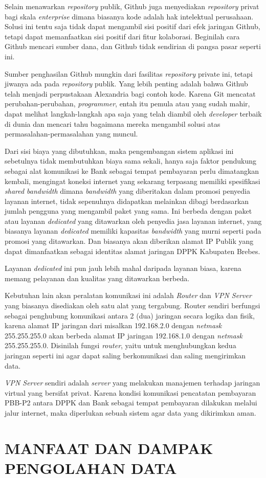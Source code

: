 \documentclass[pdftex,12pt, oneside]{article}
\begin{document}
Selain menawarkan \textit{repository} publik, Github juga menyediakan \textit{repository} privat bagi skala \textit{enterprise} dimana biasanya kode adalah hak intelektual perusahaan. Solusi ini tentu saja tidak dapat mengambil sisi positif dari efek jaringan Github, tetapi dapat memanfaatkan sisi positif dari fitur kolaborasi. Beginilah cara Github mencari sumber dana, dan Github tidak sendirian di pangsa pasar seperti ini.

Sumber penghasilan Github mungkin dari fasilitas \textit{repository} private ini, tetapi jiwanya ada pada \textit{repository} publik. Yang lebih penting adalah bahwa Github telah menjadi perpustakaan Alexandria bagi contoh kode. Karena Git mencatat perubahan-perubahan, \textit{programmer}, entah itu pemula atau yang sudah mahir, dapat melihat langkah-langkah apa saja yang telah diambil oleh \textit{developer} terbaik di dunia dan mencari tahu bagaimana mereka mengambil solusi atas permasalahan-permasalahan yang muncul. 

Dari sisi biaya yang dibutuhkan, maka pengembangan sistem aplikasi ini sebetulnya tidak membutuhkan biaya sama sekali, hanya saja faktor pendukung sebagai alat komunikasi ke Bank sebagai tempat pembayaran perlu dimatangkan kembali, mengingat koneksi internet yang sekarang terpasang memiliki spesifikasi \textit{shared bandwidth} dimana \textit{bandwidth} yang diberitakan dalam promosi penyedia layanan internet, tidak sepenuhnya didapatkan melainkan dibagi berdasarkan jumlah pengguna yang mengambil paket yang sama. Ini berbeda dengan paket atau layanan \textit{dedicated} yang ditawarkan oleh penyedia jasa layanan internet, yang biasanya layanan \textit{dedicated} memiliki kapasitas \textit{bandwidth} yang murni seperti pada promosi yang ditawarkan. Dan biasanya akan diberikan alamat IP Publik yang dapat dimanfaatkan sebagai identitas alamat jaringan DPPK Kabupaten Brebes.

Layanan \textit{dedicated} ini pun jauh lebih mahal daripada layanan biasa, karena memang pelayanan dan kualitas yang ditawarkan berbeda.

Kebutuhan lain akan peralatan komunikasi ini adalah \textit{Router} dan \textit{VPN Server} yang biasanya disediakan oleh satu alat yang tergabung. Router sendiri berfungsi sebagai penghubung komunikasi antara 2 (dua) jaringan secara logika dan fisik, karena alamat IP jaringan dari misalkan 192.168.2.0 dengan \textit{netmask} 255.255.255.0 akan berbeda alamat IP jaringan 192.168.1.0 dengan \textit{netmask} 255.255.255.0. Disinilah fungsi \textit{router}, yaitu untuk menghubungkan kedua jaringan seperti ini agar dapat saling berkomunikasi dan saling mengirimkan data.

\textit{VPN Server} sendiri adalah \textit{server} yang melakukan manajemen terhadap jaringan virtual yang bersifat privat. Karena kondisi komunikasi pencatatan pembayaran PBB-P2 antara DPPK dan Bank sebagai tempat pembayaran dilakukan melalui jalur internet, maka diperlukan sebuah sistem agar data yang dikirimkan aman. 


\section{MANFAAT DAN DAMPAK PENGOLAHAN DATA}
\end{document}
